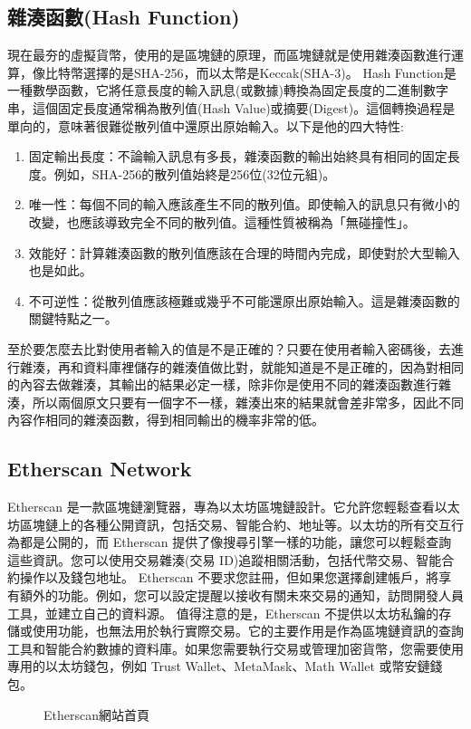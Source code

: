 \subsection{雜湊函數(Hash Function)}
現在最夯的虛擬貨幣，使用的是區塊鏈的原理，而區塊鏈就是使用雜湊函數進行運算，像比特幣選擇的是SHA-256，而以太幣是Keccak(SHA-3)。
Hash Function是一種數學函數，它將任意長度的輸入訊息(或數據)轉換為固定長度的二進制數字串，這個固定長度通常稱為散列值(Hash Value)或摘要(Digest)。這個轉換過程是單向的，意味著很難從散列值中還原出原始輸入。以下是他的四大特性:
\begin{enumerate}
\item 固定輸出長度：不論輸入訊息有多長，雜湊函數的輸出始終具有相同的固定長度。例如，SHA-256的散列值始終是256位(32位元組)。
\item 唯一性：每個不同的輸入應該產生不同的散列值。即使輸入的訊息只有微小的改變，也應該導致完全不同的散列值。這種性質被稱為「無碰撞性」。
\item 效能好：計算雜湊函數的散列值應該在合理的時間內完成，即使對於大型輸入也是如此。
\item 不可逆性：從散列值應該極難或幾乎不可能還原出原始輸入。這是雜湊函數的關鍵特點之一。
\end{enumerate}
至於要怎麼去比對使用者輸入的值是不是正確的？只要在使用者輸入密碼後，去進行雜湊，再和資料庫裡儲存的雜湊值做比對，就能知道是不是正確的，因為對相同的內容去做雜湊，其輸出的結果必定一樣，除非你是使用不同的雜湊函數進行雜湊，所以兩個原文只要有一個字不一樣，雜湊出來的結果就會差非常多，因此不同內容作相同的雜湊函數，得到相同輸出的機率非常的低。
\subsection{Etherscan Network}
Etherscan 是一款區塊鏈瀏覽器，專為以太坊區塊鏈設計。它允許您輕鬆查看以太坊區塊鏈上的各種公開資訊，包括交易、智能合約、地址等。以太坊的所有交互行為都是公開的，而 Etherscan 提供了像搜尋引擎一樣的功能，讓您可以輕鬆查詢這些資訊。您可以使用交易雜湊(交易 ID)追蹤相關活動，包括代幣交易、智能合約操作以及錢包地址。
Etherscan 不要求您註冊，但如果您選擇創建帳戶，將享有額外的功能。例如，您可以設定提醒以接收有關未來交易的通知，訪問開發人員工具，並建立自己的資料源。
值得注意的是，Etherscan 不提供以太坊私鑰的存儲或使用功能，也無法用於執行實際交易。它的主要作用是作為區塊鏈資訊的查詢工具和智能合約數據的資料庫。如果您需要執行交易或管理加密貨幣，您需要使用專用的以太坊錢包，例如 Trust Wallet、MetaMask、Math Wallet 或幣安鏈錢包。
\begin{figure}[h]
    \caption{Etherscan網站首頁}
    \label{fig:Etherscan}
\end{figure}
